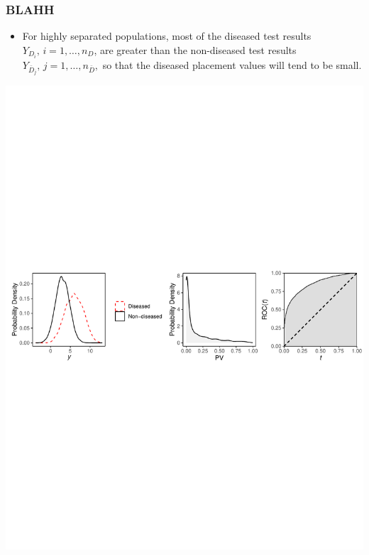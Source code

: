 \documentclass[t]{beamer}
\begin{document}
\begin{frame}
\frametitle{BLAHH}
\begin{itemize}
\item For highly separated populations, most of the diseased test results $Y_{D_i}, \, i = 1, \dots, n_D$, are greater than the non-diseased test results $Y_{\bar{D}_j}, \, j = 1, \dots, n_{\bar{D}},$ so that the diseased placement values will tend to be small.
\end{itemize}
\begin{center}
\includegraphics[scale=0.55]{PVs_ROC_high}
\end{center}
\end{frame}

\end{document}
